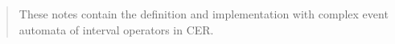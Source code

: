
\begin{abstract}
These notes contain the definition and implementation with complex event automata of interval operators in CER.
\end{abstract}